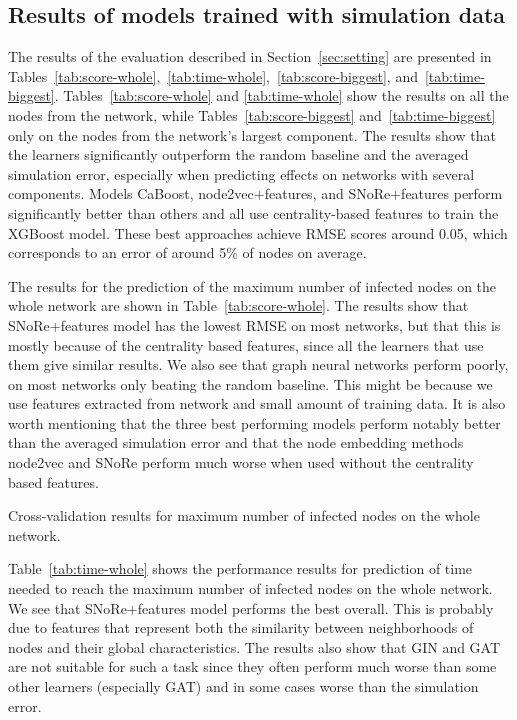 \documentclass{article}
\begin{document}
\subsection{Results of models trained with simulation data}
\label{sec:results}
The results of the evaluation described in Section~\ref{sec:setting} are presented in Tables~\ref{tab:score-whole},~\ref{tab:time-whole},~\ref{tab:score-biggest}, and~\ref{tab:time-biggest}. Tables~\ref{tab:score-whole} and \ref{tab:time-whole} show the results on all the nodes from the network, while Tables~\ref{tab:score-biggest} and~\ref{tab:time-biggest} only on the nodes from the network's largest component. The results show that the learners significantly outperform the random baseline and the averaged simulation error, especially when predicting effects on networks with several components. Models CaBoost, node2vec+features, and SNoRe+features perform significantly better than  others and all use centrality-based features to train the XGBoost model. These best approaches achieve RMSE scores around 0.05, which corresponds to an error of around 5\% of nodes on average. 

The results for the prediction of the maximum number of infected nodes on the whole network are shown in Table~\ref{tab:score-whole}. The results show that SNoRe+features model has the lowest RMSE on most networks, but that this is mostly because of the centrality based features, since all the learners that use them give similar results. We also see that graph neural networks perform poorly, on most networks only beating the random baseline. This might be because we use features extracted from network and small amount of training data. It is also worth mentioning that the three best performing models perform notably better than the averaged simulation error and that the node embedding methods node2vec and SNoRe perform much worse when used without the centrality based features.

\begin{table*}[t!]
    \centering
    	\caption{Cross-validation results for maximum number of infected nodes on the whole network.}
    \resizebox{\columnwidth}{!}{
	}
	\label{tab:score-whole}
\end{table*}

Table~\ref{tab:time-whole} shows the performance results for prediction of time needed to reach the maximum number of infected nodes on the whole network. We see that SNoRe+features model performs the best overall. This is probably due to features that represent both the similarity between neighborhoods of nodes and their global characteristics. The results also show that GIN and GAT are not suitable for such a task since they often perform much worse than some other learners (especially GAT) and in some cases worse than the simulation error.
\end{document}
